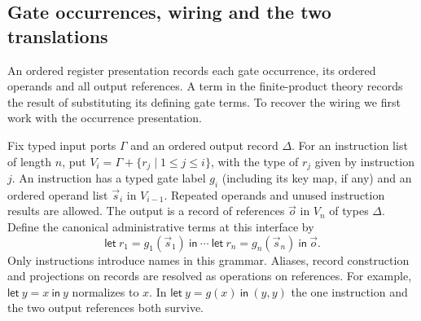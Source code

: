 \documentclass[11pt,a4paper]{article}
\theoremstyle{definition}
\theoremstyle{remark}\newaliascnt{remark}{theorem}
\numberwithin{equation}{section}
\begin{document}
\subsection{Gate occurrences, wiring and the two translations}
An ordered register presentation records each gate occurrence, its ordered operands and all output references. A term in the finite-product theory records the result of substituting its defining gate terms. To recover the wiring we first work with the occurrence presentation.

Fix typed input ports \(\Gamma\) and an ordered output record \(\Delta\). For an instruction list of length \(n\), put \(V_i=\Gamma+\{r_j\mid 1\le j\le i\}\), with the type of \(r_j\) given by instruction \(j\). An instruction has a typed gate label \(g_i\) (including its key map, if any) and an ordered operand list \(\vec s_i\) in \(V_{i-1}\). Repeated operands and unused instruction results are allowed. The output is a record of references \(\vec o\) in \(V_n\) of types \(\Delta\). Define the canonical administrative terms at this interface by
\[
 \mathsf{let}\ r_1=g_1(\vec s_1)\ \mathsf{in}\ \cdots\
 \mathsf{let}\ r_n=g_n(\vec s_n)\ \mathsf{in}\ \vec o .
\]
Only instructions introduce names in this grammar. Aliases, record construction and projections on records are resolved as operations on references. For example, \(\mathsf{let}\ y=x\ \mathsf{in}\ y\) normalizes to \(x\). In \(\mathsf{let}\ y=g(x)\ \mathsf{in}\ (y,y)\) the one instruction and the two output references both survive.
\end{document}
